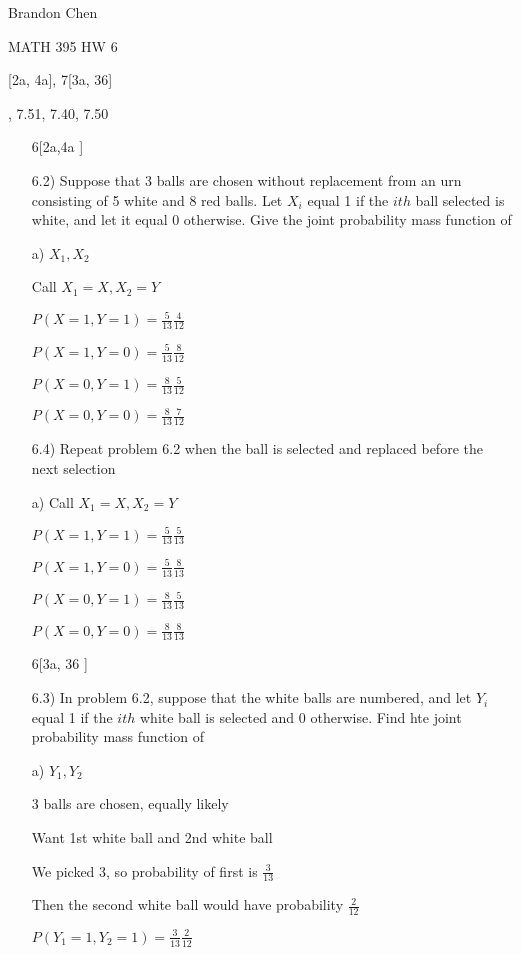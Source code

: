\documentclass[11pt]{article}
\begin{document}
\noindent Brandon Chen

\noindent MATH 395 HW 6

[2a, 4a], 7[3a, 36]

, 7.51, 7.40, 7.50

\begin{itemize}

	\item[6[2a,4a]]

		6.2) Suppose that 3 balls are chosen without replacement from an urn consisting of 5 white and 8 red balls. Let $X_i$ equal 1 if the $ith$ ball selected is white, and let it equal 0 otherwise. Give the joint probability mass function of 

		a) $X_1, X_2$
		
		Call $X_1 = X, X_2 = Y$

		$P(X=1, Y = 1) = \frac{5}{13} \frac{4}{12}$

		$P(X=1, Y = 0) = \frac{5}{13} \frac{8}{12}$

		$P(X=0, Y = 1) = \frac{8}{13} \frac{5}{12}$

		$P(X=0, Y = 0) = \frac{8}{13} \frac{7}{12}$

		6.4) Repeat problem 6.2 when the ball is selected and replaced before the next selection

		a) Call $X_1 = X, X_2 = Y$

		$P(X=1,Y = 1) = \frac{5}{13}\frac{5}{13}$

		$P(X=1,Y =0) = \frac{5}{13}\frac{8}{13}$

		$P(X=0, Y = 1) = \frac{8}{13} \frac{5}{13}$

		$P(X = 0, Y = 0) = \frac{8}{13} \frac{8}{13}$

	\item[6[3a, 36]]

		6.3) In problem 6.2, suppose that the white balls are numbered, and let $Y_i$ equal 1 if the $ith$ white ball is selected and 0 otherwise. Find hte joint probability mass function of 

		a) $Y_1, Y_2$

		3 balls are chosen, equally likely

		Want 1st white ball and 2nd white ball

		We picked 3, so probability of first is $\frac{3}{13}$

		Then the second white ball would have probability $\frac{2}{12}$

		$P(Y_1 = 1, Y_2 = 1) = \frac{3}{13} \frac{2}{12}$


\end{itemize}
\end{document}
